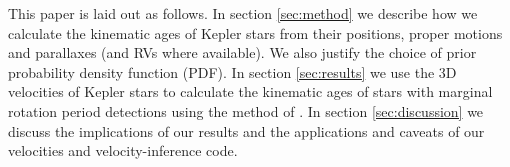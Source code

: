 
This paper is laid out as follows.
In section \ref{sec:method} we describe how we calculate the kinematic ages of
Kepler stars from their positions, proper motions and parallaxes (and RVs
where available).
We also justify the choice of prior probability density function (PDF).
In section \ref{sec:results} we use the 3D velocities of Kepler stars to
calculate the kinematic ages of stars with marginal rotation period
detections using the method of \citet{lu2021}.
In section \ref{sec:discussion} we discuss the implications of our results and
the applications and caveats of our velocities and velocity-inference code.
